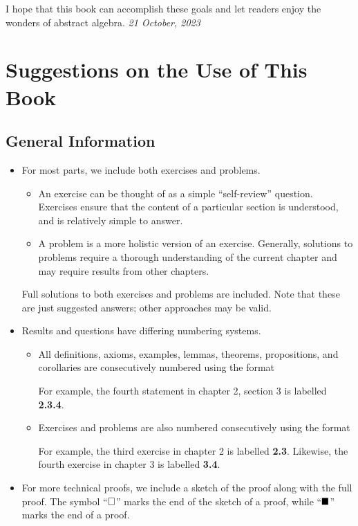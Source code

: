 I hope that this book can accomplish these goals and let readers enjoy the wonders of abstract algebra.
\hfill{\textit{21 October, 2023}}

\chapter{Suggestions on the Use of This Book}
\section*{General Information}
\begin{itemize}
    \item For most parts, we include both exercises and problems.
    \begin{itemize}
        \item An exercise can be thought of as a simple ``self-review'' question. Exercises ensure that the content of a particular section is understood, and is relatively simple to answer.
        \item A problem is a more holistic version of an exercise. Generally, solutions to problems require a thorough understanding of the current chapter and may require results from other chapters.
    \end{itemize}
    Full solutions to both exercises and problems are included. Note that these are just suggested answers; other approaches may be valid.

    \item Results and questions have differing numbering systems.
    \begin{itemize}
        \item All definitions, axioms, examples, lemmas, theorems, propositions, and corollaries are consecutively numbered using the format
        \begin{quote}
        \end{quote}
        For example, the fourth statement in chapter 2, section 3 is labelled \textbf{2.3.4}.
        \item Exercises and problems are also numbered consecutively using the format
        \begin{quote}
        \end{quote}
        For example, the third exercise in chapter 2 is labelled \textbf{2.3}. Likewise, the fourth exercise in chapter 3 is labelled \textbf{3.4}.
    \end{itemize}
    \item For more technical proofs, we include a sketch of the proof along with the full proof. The symbol ``$\square$'' marks the end of the sketch of a proof, while ``$\blacksquare$'' marks the end of a proof.
\end{itemize}

